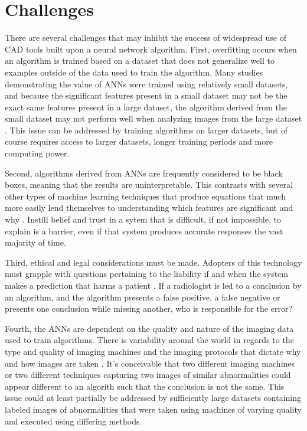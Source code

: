 \documentclass[sigconf]{acmart}
\begin{document}
\section{Challenges}

There are several challenges that may inhibit the success of widespread use of CAD tools built upon a neural network algorithm. First, overfitting occurs when an algorithm is trained based on a dataset that does not generalize well to examples outside of the data used to train the algorithm. Many studies demonstrating the value of ANNs were trained using relatively small datasets, and because the significant features present in a small dataset may not be the exact same features present in a large dataset, the algorithm derived from the small dataset may not perform well when analyzing images from the large dataset \cite{cite08} \cite{cite05}. This issue can be addressed by training algorithms on larger datasets, but of course requires access to larger datasets, longer training periods and more computing power.

Second, algorithms derived from ANNs are frequently considered to be black boxes, meaning that the results are uninterpretable. This contrasts with several other types of machine learning techniques that produce equations that much more easily lend themselves to understanding which features are significant and why \cite{cite05}. Instill belief and trust in a sytem that is difficult, if not impossible, to explain is a barrier, even if that system produces accurate responses the vast majority of time.

Third, ethical and legal considerations must be made. Adopters of this technology must grapple with questions pertaining to the liability if and when the system makes a prediction that harms a patient \cite{cite05}. If a radiologist is led to a conclusion by an algorithm, and the algorithm presents a false positive, a false negative or presents one conclusion while missing another, who is responsible for the error?

Fourth, the ANNs are dependent on the quality and nature of the imaging data used to train algorithms. There is variability around the world in regards to the type and quality of imaging machines and the imaging protocols that dictate why and how images are taken \cite{cite05}. It's conceivable that two different imaging machines or two different techniques capturing two images of similar abnormalities could appear different to an algorith such that the conclusion is not the same. This issue could at least partially be addressed by sufficiently large datasets containing labeled images of abnormalities that were taken using machines of varying quality and executed using differing methods.
\end{document}
